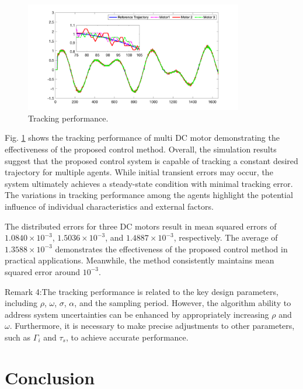 \documentclass[journal,onecolumn]{IEEEtran}
\begin{document}
\begin{figure}[H]
    \centering
    \includegraphics[width=0.85\textwidth]{dataplot.png}
    \caption{Tracking performance.}
    \label{fig:output} %
\end{figure}

Fig. \ref{fig:output} shows the tracking performance of multi DC motor demonstrating the effectiveness of the proposed control method.
Overall, the simulation results suggest that the proposed control system is capable of tracking a constant desired trajectory for multiple agents. While initial transient errors may occur, the system ultimately achieves a steady-state condition with minimal tracking error. The variations in tracking performance among the agents highlight the potential influence of individual characteristics and external factors.

The distributed errors for three DC motors result in mean squared errors of \(1.0840 \times 10^{-3}\), \(1.5036 \times 10^{-3}\), and \(1.4887 \times 10^{-3}\), respectively. The average of \(1.3588 \times 10^{-3}\) demonstrates the effectiveness of the proposed control method in practical applications. Meanwhile, the method consistently maintains mean squared error around \(10^{-3}\).

Remark 4:The tracking performance is related to the key design parameters, including $\rho$, $\omega$, $\sigma$, $\alpha$, and the sampling period. However, the algorithm ability to address system uncertainties can be enhanced by appropriately increasing $\rho$ and $\omega$. Furthermore, it is necessary to make precise adjustments to other parameters, such as $\Gamma_i$ and $\tau_s$, to achieve accurate performance.

\section{Conclusion}
\end{document}
